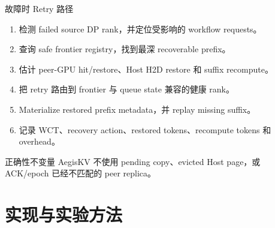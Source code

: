 \documentclass[aspectratio=43]{beamer}
\newcommand{\tightitems}{\setlength{\itemsep}{2pt}\setlength{\parskip}{0pt}}
\newcommand{\AegisKV}{AegisKV}
\begin{document}
\begin{frame}{故障时 Retry 路径}
  \small
  \begin{enumerate}
    \tightitems
    \item 检测 failed source DP rank，并定位受影响的 workflow requests。
    \item 查询 safe frontier registry，找到最深 recoverable prefix。
    \item 估计 peer-GPU hit/restore、Host H2D restore 和 suffix recompute。
    \item 把 retry 路由到 frontier 与 queue state 兼容的健康 rank。
    \item Materialize restored prefix metadata，并 replay missing suffix。
    \item 记录 WCT、recovery action、restored tokens、recompute tokens 和 overhead。
  \end{enumerate}

  \vspace{0.14cm}
  \begin{block}{正确性不变量}
    \AegisKV{} 不使用 pending copy、evicted Host page，或 ACK/epoch 已经不匹配的 peer replica。
  \end{block}
\end{frame}

\section{实现与实验方法}
\end{document}
